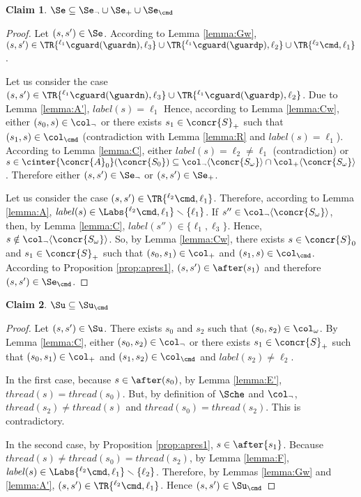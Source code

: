 \documentclass[12pt]{article}
\let\firstunion\cup
\let\firstinter\cap
\let\cup\firstunion
\let\cap\firstinter
\renewcommand{\subset}{\subseteq}
\newcommand{\li}[1]{ {}^{\ell_{#1}}  }
\newcommand{\lbl}{\mathit{label}}
\newcommand{\thread}{\mathit{thread}}
\newtheorem{claim}{Claim}
\begin{document}
\begin{claim}\label{claim:WSe}
 \(\Se\subset\Se_{\neg}\cup\Se_{{+}}\cup\Se_{\cmd}\)
\end{claim}
\begin{proof}
 Let \((s,s')\in\Se\). According to Lemma \ref{lemma:Gw}, \((s,s')\in \TR{\li1 \cguard(\guardn),\ell_3}\cup\TR{\li1\cguard(\guardp),\ell_2}\cup\TR{\li2\cmd,\ell_1} \).
 
 Let us consider the case \((s,s')\in \TR{\li1 \cguard(\guardn),\ell_3}\cup\TR{\li1\cguard(\guardp),\ell_2}\). Due to Lemma \ref{lemma:A'}, \(\lbl(s)=\ell_1\)
 Hence, according to Lemma \ref{lemma:Cw}, either \((s_0,s)\in\col_{\neg}\) or there exists \(s_1\in\concr{S}_{+}\) such that \((s_1,s)\in \col_{\cmd}\) (contradiction with Lemma \ref{lemma:R} and \(\lbl(s)=\ell_1\)).
 According to Lemma \ref{lemma:C}, either \(\lbl(s)=\ell_2\neq\ell_1\) (contradiction) or \(s\in\cinter{\concr{A}_0}(\concr{S_0})\subset\col_{\neg}\langle\concr{S_\omega}\rangle\cap\col_{{+}}\langle\concr{S_\omega}\rangle\). Therefore either \((s,s')\in \Se_{\neg}\) or \((s,s')\in \Se_{{+}}\).

 Let us consider the case \((s,s')\in \TR{\li2\cmd,\ell_1} \). Therefore, according to Lemma \ref{lemma:A}, \(\lbl(s)\in \Labs{\li2\cmd,\ell_1}\smallsetminus\{\ell_1\} \).
If \(s''\in\col_{\neg}\langle\concr{S_{\omega}}\rangle\), then, by Lemma \ref{lemma:C}, \(\lbl(s'')\in\{\ell_1,\ell_3\}\). Hence, \(s\notin\col_{\neg}\langle\concr{S_{\omega}}\rangle\).
So, by Lemma \ref{lemma:Cw}, there exists \(s\in\concr{S}_0\) and \(s_1\in\concr{S}_{{+}}\) such that \((s_0,s_1)\in\col_{{+}}\) and \((s_1,s)\in\col_{\cmd}\). According to Proposition \ref{prop:apres1}, \((s,s')\in\after(s_1)\) and therefore \((s,s')\in\Se_{\cmd}\).
\end{proof}


\begin{claim}\label{claim:WSu}
 \(\Su\subset\Su_{\cmd}\)
\end{claim}
\begin{proof}
 Let \((s,s')\in\Su\). There exists \(s_0\) and \(s_2\) such that \((s_0,s_2)\in \col_{\omega}\).
 By Lemma \ref{lemma:C}, either \((s_0,s_2)\in\col_{\neg}\) or there exists \(s_1\in\concr{S}_{{+}}\) such that \((s_0,s_1)\in\col_{{+}}\) and \((s_1,s_2)\in\col_{\cmd}\) and \(\lbl(s_2)\neq\ell_2\).
  
  In the first case, because \(s\in\after(s_0)\), by Lemma \ref{lemma:E'}, \(\thread(s)=\thread(s_0)\). But, by definition of \(\Sche\) and \(\col_{{\neg}}\), \(\thread(s_2)\neq\thread(s)\) and \(\thread(s_0)=\thread(s_2)\). This is contradictory.
  
  In the second case, by Proposition \ref{prop:apres1}, \(s\in\after{s_1}\). Because \(\thread(s)\neq\thread(s_0)=\thread(s_2)\), by Lemma \ref{lemma:F}, \(\lbl(s)\in\Labs{\li2\cmd,\ell_1}\smallsetminus\{\ell_2\}\). Therefore, by Lemmas \ref{lemma:Gw} and \ref{lemma:A'}, \((s,s')\in\TR{\li2\cmd,\ell_1}\). Hence \((s,s')\in \Su_{\cmd}\)
\end{proof}
\end{document}
